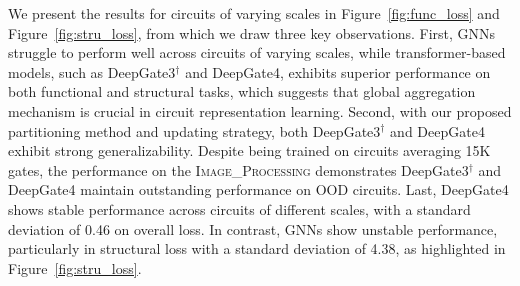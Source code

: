 


We present the results for circuits of varying scales in Figure~\ref{fig:func_loss} and Figure~\ref{fig:stru_loss}, from which we draw three key observations. 
First, GNNs struggle to perform well across circuits of varying scales, while transformer-based models, such as DeepGate3$^\dag$ and DeepGate4, exhibits superior performance on both functional and structural tasks, which suggests that global aggregation mechanism is crucial in circuit representation learning. 
Second, with our proposed partitioning method and updating strategy, both DeepGate3$^\dag$ and DeepGate4 exhibit strong generalizability.
Despite being trained on circuits averaging 15K gates, the performance on the \textsc{Image\_Processing} demonstrates DeepGate3$^\dag$ and DeepGate4 maintain outstanding performance on OOD circuits. 
Last, DeepGate4 shows stable performance across circuits of different scales, with a standard deviation of 0.46 on overall loss. In contrast, GNNs show unstable performance, particularly in structural loss with a standard deviation of 4.38, as highlighted in Figure~\ref{fig:stru_loss}.




